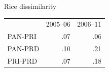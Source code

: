\documentclass[bigger]{beamer}
\begin{document}
\begin{frame}[label={sec:org46b75cf}]{Rice dissimilarity}
\begin{center}
\begin{tabular}{lrr}
 & 2005--06 & 2006--11\\
PAN-PRI & .07 & .06\\
PAN-PRD & .10 & .21\\
PRI-PRD & .07 & .18\\
\end{tabular}
\end{center}
\end{frame}
\end{document}
